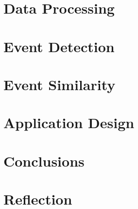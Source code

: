 \documentclass[11pt, a4paper]{scrartcl}
\begin{document}
\section{Data Processing}






\section{Event Detection} \label{sec:eventdetection}


\section{Event Similarity}


\section{Application Design}


\section{Conclusions}


\section{Reflection}


\newpage


\appendix

\newpage

\newpage

\newpage

\newpage

\end{document}
